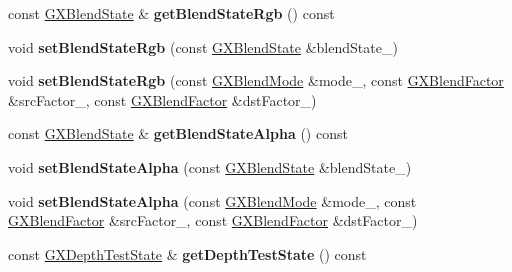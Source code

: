 \begin{DoxyCompactItemize}
\item 
const \hyperlink{class_magnum_1_1_g_x_blend_state}{G\+X\+Blend\+State} \& {\bfseries get\+Blend\+State\+Rgb} () const \hypertarget{class_magnum_1_1_g_x_context_a76dd7a2065a2616173696b5685cc4a85}{}\label{class_magnum_1_1_g_x_context_a76dd7a2065a2616173696b5685cc4a85}

\item 
void {\bfseries set\+Blend\+State\+Rgb} (const \hyperlink{class_magnum_1_1_g_x_blend_state}{G\+X\+Blend\+State} \&blend\+State\+\_\+)\hypertarget{class_magnum_1_1_g_x_context_a7cdbbc4ae1c993d69c2c9de12cd3156f}{}\label{class_magnum_1_1_g_x_context_a7cdbbc4ae1c993d69c2c9de12cd3156f}

\item 
void {\bfseries set\+Blend\+State\+Rgb} (const \hyperlink{class_magnum_1_1_g_x_blend_mode}{G\+X\+Blend\+Mode} \&mode\+\_\+, const \hyperlink{class_magnum_1_1_g_x_blend_factor}{G\+X\+Blend\+Factor} \&src\+Factor\+\_\+, const \hyperlink{class_magnum_1_1_g_x_blend_factor}{G\+X\+Blend\+Factor} \&dst\+Factor\+\_\+)\hypertarget{class_magnum_1_1_g_x_context_a8ab1f4663e2aafe58b78951544530fba}{}\label{class_magnum_1_1_g_x_context_a8ab1f4663e2aafe58b78951544530fba}

\item 
const \hyperlink{class_magnum_1_1_g_x_blend_state}{G\+X\+Blend\+State} \& {\bfseries get\+Blend\+State\+Alpha} () const \hypertarget{class_magnum_1_1_g_x_context_adb72782ef2ea063b754b18cf85470f8e}{}\label{class_magnum_1_1_g_x_context_adb72782ef2ea063b754b18cf85470f8e}

\item 
void {\bfseries set\+Blend\+State\+Alpha} (const \hyperlink{class_magnum_1_1_g_x_blend_state}{G\+X\+Blend\+State} \&blend\+State\+\_\+)\hypertarget{class_magnum_1_1_g_x_context_a41190096effdf7968f52c7fa5786d63f}{}\label{class_magnum_1_1_g_x_context_a41190096effdf7968f52c7fa5786d63f}

\item 
void {\bfseries set\+Blend\+State\+Alpha} (const \hyperlink{class_magnum_1_1_g_x_blend_mode}{G\+X\+Blend\+Mode} \&mode\+\_\+, const \hyperlink{class_magnum_1_1_g_x_blend_factor}{G\+X\+Blend\+Factor} \&src\+Factor\+\_\+, const \hyperlink{class_magnum_1_1_g_x_blend_factor}{G\+X\+Blend\+Factor} \&dst\+Factor\+\_\+)\hypertarget{class_magnum_1_1_g_x_context_ad9fd13f072e3fbd149622ce31012619f}{}\label{class_magnum_1_1_g_x_context_ad9fd13f072e3fbd149622ce31012619f}

\item 
const \hyperlink{class_magnum_1_1_g_x_depth_test_state}{G\+X\+Depth\+Test\+State} \& {\bfseries get\+Depth\+Test\+State} () const \hypertarget{class_magnum_1_1_g_x_context_af9249ab05633c731ade3e57849cd5cac}{}\label{class_magnum_1_1_g_x_context_af9249ab05633c731ade3e57849cd5cac}


\end{DoxyCompactItemize}
